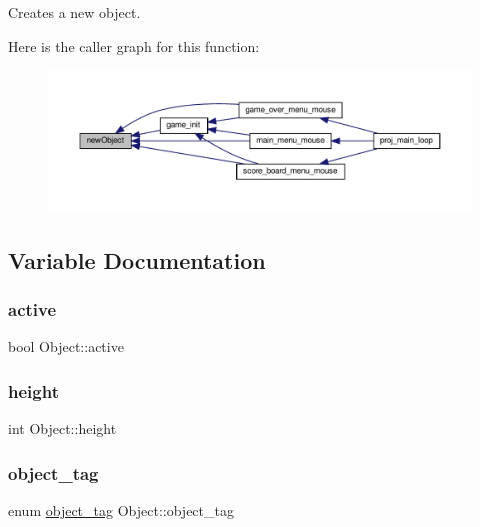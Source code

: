 Creates a new object. 

Here is the caller graph for this function\+:\nopagebreak
\begin{figure}[H]
\begin{center}
\leavevmode
\includegraphics[width=350pt]{group__utils_gad24d82cbacfb1bf3af2491088d770602_icgraph}
\end{center}
\end{figure}


\subsection{Variable Documentation}
\mbox{\label{group__utils_gac16b5f9f4fa1d1787dd0937b48d62377}} 
\subsubsection{\texorpdfstring{active}{active}}
{\footnotesize\ttfamily bool Object\+::active}

\mbox{\label{group__utils_gacda1358783bae0b0071ae66e3fc26737}} 
\subsubsection{\texorpdfstring{height}{height}}
{\footnotesize\ttfamily int Object\+::height}

\mbox{\label{group__utils_gaac0293be1f10fd2268ddeaac7184600d}} 
\subsubsection{\texorpdfstring{object\+\_\+tag}{object\_tag}}
{\footnotesize\ttfamily enum \hyperlink{group__utils_ga3eff9ebd9f241e211e00b991e2ac60fc}{object\+\_\+tag} Object\+::object\+\_\+tag}

